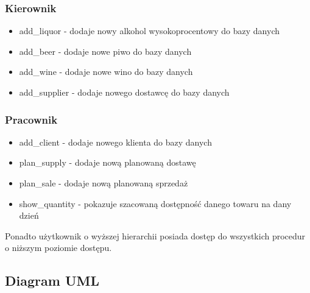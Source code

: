 \documentclass[12pt,a4paper]{article}
\begin{document}
    \subsubsection*{Kierownik}
        \begin{itemize}
            \item \textsf{add\_liquor} - dodaje nowy alkohol wysokoprocentowy do bazy danych
            \item \textsf{add\_beer} - dodaje nowe piwo do bazy danych
            \item \textsf{add\_wine} - dodaje nowe wino do bazy danych
            \item \textsf{add\_supplier} - dodaje nowego dostawcę do bazy danych
        \end{itemize}
    
    \subsubsection*{Pracownik}
        \begin{itemize}
            \item \textsf{add\_client} - dodaje nowego klienta do bazy danych
            \item \textsf{plan\_supply} - dodaje nową planowaną dostawę
            \item \textsf{plan\_sale} - dodaje nową planowaną sprzedaż
            \item \textsf{show\_quantity} - pokazuje szacowaną dostępność danego towaru na dany dzień
        \end{itemize}
        
        Ponadto użytkownik o wyższej hierarchii posiada dostęp do wszystkich procedur o niższym poziomie dostępu.
        
\subsection*{Diagram UML}
        
\end{document}
